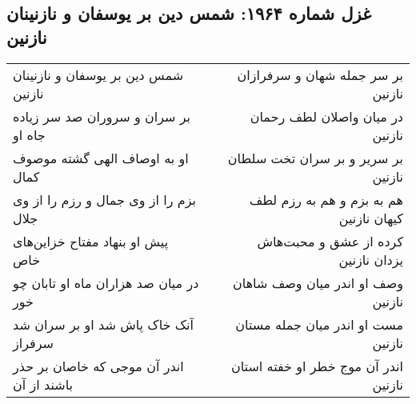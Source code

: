 \begin{center}
\section*{غزل شماره ۱۹۶۴: شمس دین بر یوسفان و نازنینان نازنین}
\label{sec:1964}
\begin{longtable}{l p{0.5cm} r}
شمس دین بر یوسفان و نازنینان نازنین
&&
بر سر جمله شهان و سرفرازان نازنین
\\
بر سران و سروران صد سر زیاده جاه او
&&
در میان واصلان لطف رحمان نازنین
\\
او به اوصاف الهی گشته موصوف کمال
&&
بر سریر و بر سران تخت سلطان نازنین
\\
بزم را از وی جمال و رزم را از وی جلال
&&
هم به بزم و هم به رزم لطف کیهان نازنین
\\
پیش او بنهاد مفتاح خزاین‌های خاص
&&
کرده از عشق و محبت‌هاش یزدان نازنین
\\
در میان صد هزاران ماه او تابان چو خور
&&
وصف او اندر میان وصف شاهان نازنین
\\
آنک خاک پاش شد او بر سران شد سرفراز
&&
مست او اندر میان جمله مستان نازنین
\\
اندر آن موجی که خاصان بر حذر باشند از آن
&&
اندر آن موج خطر او خفته استان نازنین
\\
\end{longtable}
\end{center}
